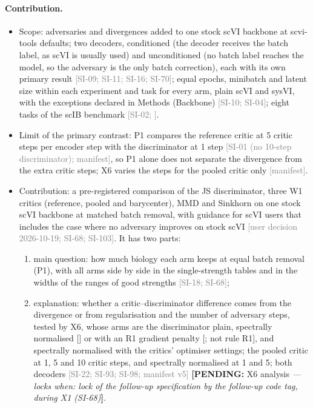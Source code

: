 \documentclass[11pt]{article}
\newcommand{\src}[1]{{\scriptsize\textcolor{gray}{[#1]}}}
\newcommand{\pending}[2]{{\color{BurntOrange}\textbf{[PENDING:} #1 \textit{--- locks when: #2}\textbf{]}}}
\begin{document}
\paragraph{Contribution.}
\begin{itemize}
\item Scope: adversaries and divergences added to one stock scVI backbone at scvi-tools defaults; two decoders, conditioned (the decoder receives the batch label, as scVI is usually used) and unconditioned (no batch label reaches the model, so the adversary is the only batch correction), each with its own primary result \src{SI-09; SI-11; SI-16; SI-70}; equal epochs, minibatch and latent size within each experiment and task for every arm, plain scVI and sysVI, with the exceptions declared in Methods (Backbone) \src{SI-10; SI-04}; eight tasks of the scIB benchmark \src{SI-02; }.
\item Limit of the primary contrast: P1 compares the reference critic at 5 critic steps per encoder step with the discriminator at 1 step \src{SI-01 (no 10-step discriminator); manifest}, so P1 alone does not separate the divergence from the extra critic steps; X6 varies the steps for the pooled critic only \src{manifest}.
\item Contribution: a pre-registered comparison of the JS discriminator, three W1 critics (reference, pooled and barycenter), MMD and Sinkhorn on one stock scVI backbone at matched batch removal, with guidance for scVI users that includes the case where no adversary improves on stock scVI \src{user decision 2026-10-19; SI-68; SI-103}. It has two parts:
\begin{enumerate}
\item main question: how much biology each arm keeps at equal batch removal (P1), with all arms side by side in the single-strength tables and in the widths of the ranges of good strengths \src{SI-18; SI-68};
\item explanation: whether a critic--discriminator difference comes from the divergence or from regularisation and the number of adversary steps, tested by X6, whose arms are the discriminator plain, spectrally normalised [\citealp{miyato2018spectral}] or with an R1 gradient penalty [\citealp{mescheder2018training}; not rule R1], and spectrally normalised with the critics' optimiser settings; the pooled critic at 1, 5 and 10 critic steps, and spectrally normalised at 1 and 5; both decoders \src{SI-22; SI-93; SI-98; manifest v5} \pending{X6 analysis}{lock of the follow-up specification by the follow-up code tag, during X1 (SI-68)}.

\end{enumerate}
\end{itemize}
\end{document}
